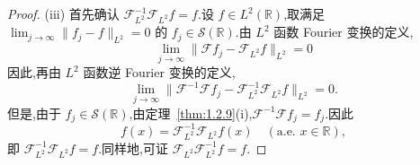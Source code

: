 \begin{proof}
(iii) 首先确认 $\mathcal{F}_{L^{2}}^{-1}\mathcal{F}_{L^{2}}f = f$.设 $f \in L^{2}(\mathbb{R})$,取满足 $\lim_{j \to \infty}\|f_{j} - f\|_{L^{2}} = 0$ 的 $f_{j} \in \mathcal{S}(\mathbb{R})$.由 $L^{2}$ 函数 Fourier 变换的定义,
\begin{equation*}
\lim_{j \to \infty}\|\mathcal{F}f_{j} - \mathcal{F}_{L^{2}}f\|_{L^{2}} = 0
\end{equation*}
因此,再由 $L^{2}$ 函数逆 Fourier 变换的定义,
\begin{equation*}
\lim_{j \to \infty}\|\mathcal{F}^{-1}\mathcal{F}f_{j} - \mathcal{F}_{L^{2}}^{-1}\mathcal{F}_{L^{2}}f\|_{L^{2}} = 0.
\end{equation*}
但是,由于 $f_{j} \in \mathcal{S}(\mathbb{R})$,由定理~\ref{thm:1.2.9}(i),$\mathcal{F}^{-1}\mathcal{F}f_{j} = f_{j}$.因此
\begin{equation*}
f(x) = \mathcal{F}_{L^{2}}^{-1}\mathcal{F}_{L^{2}}f(x) \quad (\text{a.e. } x \in \mathbb{R}),
\end{equation*}
即 $\mathcal{F}_{L^{2}}^{-1}\mathcal{F}_{L^{2}}f = f$.同样地,可证 $\mathcal{F}_{L^{2}}\mathcal{F}_{L^{2}}^{-1}f = f$.


\end{proof}
